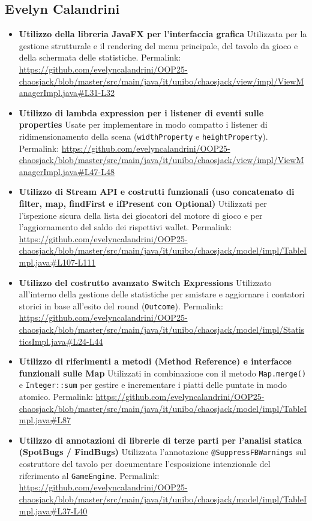 \documentclass[a4paper,12pt]{report}
\begin{document}
\subsection*{Evelyn Calandrini}

\begin{itemize}
    \item \textbf{Utilizzo della libreria JavaFX per l'interfaccia grafica}
    Utilizzata per la gestione strutturale e il rendering del menu principale, del tavolo da gioco e della schermata delle statistiche. 
    Permalink: \url{https://github.com/evelyncalandrini/OOP25-chaosjack/blob/master/src/main/java/it/unibo/chaosjack/view/impl/ViewManagerImpl.java#L31-L32}
    \item \textbf{Utilizzo di lambda expression per i listener di eventi sulle properties}
    Usate per implementare in modo compatto i listener di ridimensionamento della scena (\texttt{widthProperty} e \texttt{heightProperty}). 
    Permalink: \url{https://github.com/evelyncalandrini/OOP25-chaosjack/blob/master/src/main/java/it/unibo/chaosjack/view/impl/ViewManagerImpl.java#L47-L48}
    \item \textbf{Utilizzo di Stream API e costrutti funzionali (uso concatenato di filter, map, findFirst e ifPresent con Optional)} 
    Utilizzati per l'ispezione sicura della lista dei giocatori del motore di gioco e per l'aggiornamento del saldo dei rispettivi wallet. 
    Permalink: \url{https://github.com/evelyncalandrini/OOP25-chaosjack/blob/master/src/main/java/it/unibo/chaosjack/model/impl/TableImpl.java#L107-L111}
    \item \textbf{Utilizzo del costrutto avanzato Switch Expressions} 
    Utilizzato all'interno della gestione delle statistiche per smistare e aggiornare i contatori storici in base all'esito del round (\texttt{Outcome}). 
    Permalink: \url{https://github.com/evelyncalandrini/OOP25-chaosjack/blob/master/src/main/java/it/unibo/chaosjack/model/impl/StatisticsImpl.java#L24-L44}
    \item \textbf{Utilizzo di riferimenti a metodi (Method Reference) e interfacce funzionali sulle Map}
    Utilizzati in combinazione con il metodo \texttt{Map.merge()} e \texttt{Integer::sum} per gestire e incrementare i piatti delle puntate in modo atomico. 
    Permalink: \url{https://github.com/evelyncalandrini/OOP25-chaosjack/blob/master/src/main/java/it/unibo/chaosjack/model/impl/TableImpl.java#L87}
    \item \textbf{Utilizzo di annotazioni di librerie di terze parti per l'analisi statica (SpotBugs / FindBugs)} 
    Utilizzata l'annotazione \texttt{@SuppressFBWarnings} sul costruttore del tavolo per documentare l'esposizione intenzionale del riferimento al \texttt{GameEngine}. 
    Permalink: \url{https://github.com/evelyncalandrini/OOP25-chaosjack/blob/master/src/main/java/it/unibo/chaosjack/model/impl/TableImpl.java#L37-L40}
\end{itemize}
\end{document}
